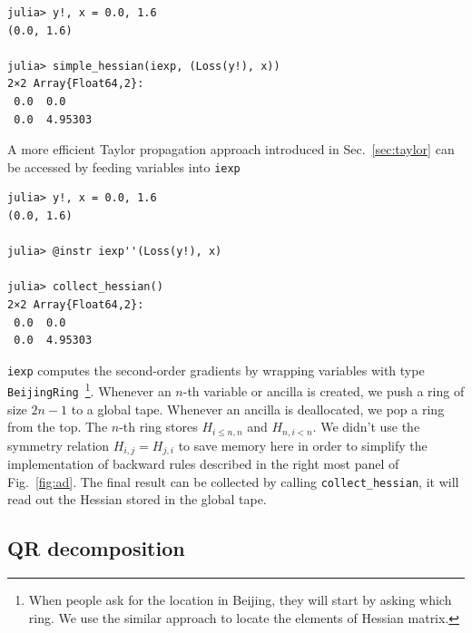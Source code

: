 \documentclass[aps,twocolumn,longbibliography,english,superscriptaddress]{revtex4-1}
\newcommand{\<}{\langle}
\renewcommand{\>}{\rangle}
\newcommand{\Fig}[1]{Fig.~\ref{#1}}
\newcommand{\Sec}[1]{Sec.~\ref{#1}}
\theoremstyle{definition}\newtheorem{definition}{\textit{Definition}}
\begin{document}
\begin{minipage}{.44\textwidth}
\begin{lstlisting}
julia> y!, x = 0.0, 1.6
(0.0, 1.6)

julia> simple_hessian(iexp, (Loss(y!), x))
2×2 Array{Float64,2}:
 0.0  0.0
 0.0  4.95303
\end{lstlisting}
\end{minipage}


A more efficient Taylor propagation approach introduced in \Sec{sec:taylor} can be accessed by feeding variables into \texttt{iexp\textquotesingle\textquotesingle}

\begin{minipage}{.44\textwidth}
\begin{lstlisting}
julia> y!, x = 0.0, 1.6
(0.0, 1.6)

julia> @instr iexp''(Loss(y!), x)

julia> collect_hessian()
2×2 Array{Float64,2}:
 0.0  0.0
 0.0  4.95303
\end{lstlisting}
\end{minipage}

\texttt{iexp\textquotesingle\textquotesingle} computes the second-order gradients by wrapping variables with type \texttt{BeijingRing}~\footnote{When people ask for the location in Beijing, they will start by asking which ring. We use the similar approach to locate the elements of Hessian matrix.}.
Whenever an $n$-th variable or ancilla is created, we push a ring of size $2n-1$ to a global tape. Whenever an ancilla is deallocated, we pop a ring from the top. The $n$-th ring stores $H_{i\leq n,n}$ and $H_{n,i<n}$. We didn't use the symmetry relation $H_{i,j} = H_{j,i}$ to save memory here in order to simplify the implementation of backward rules described in the right most panel of \Fig{fig:ad}.
The final result can be collected by calling \texttt{collect\_hessian}, it will read out the Hessian stored in the global tape.

\subsection{QR decomposition}
\end{document}

